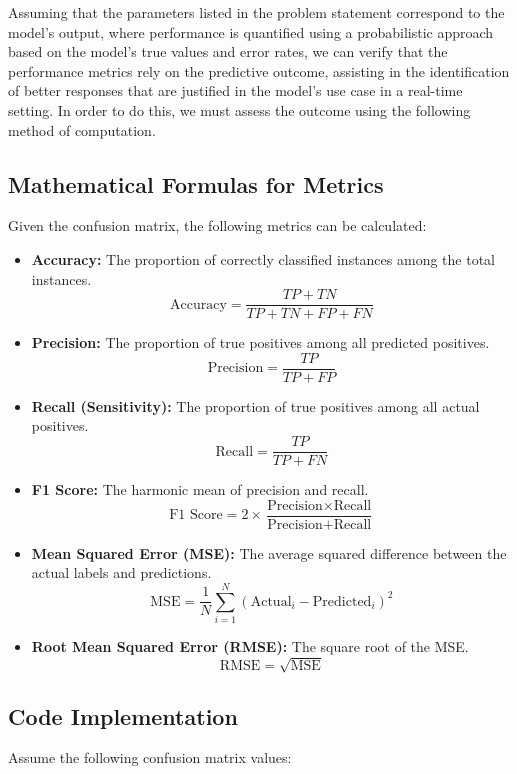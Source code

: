 \documentclass{exam}
\begin{document}
Assuming that the parameters listed in the problem statement correspond to the model's output, where performance is quantified using a probabilistic approach based on the model's true values and error rates, we can verify that the performance metrics rely on the predictive outcome, assisting in the identification of better responses that are justified in the model's use case in a real-time setting. In order to do this, we must assess the outcome using the following method of computation.

\subsection*{Mathematical Formulas for Metrics}
Given the confusion matrix, the following metrics can be calculated:

\begin{itemize}
    \item \textbf{Accuracy:} The proportion of correctly classified instances among the total instances.
    \[
    \text{Accuracy} = \frac{TP + TN}{TP + TN + FP + FN}
    \]
    
    \item \textbf{Precision:} The proportion of true positives among all predicted positives.
    \[
    \text{Precision} = \frac{TP}{TP + FP}
    \]
    
    \item \textbf{Recall (Sensitivity):} The proportion of true positives among all actual positives.
    \[
    \text{Recall} = \frac{TP}{TP + FN}
    \]
    
    \item \textbf{F1 Score:} The harmonic mean of precision and recall.
    \[
    \text{F1\ Score} = 2 \times \frac{\text{Precision} \times \text{Recall}}{\text{Precision} + \text{Recall}}
    \]
    
    \item \textbf{Mean Squared Error (MSE):} The average squared difference between the actual labels and predictions.
    \[
    \text{MSE} = \frac{1}{N} \sum_{i=1}^{N} (\text{Actual}_i - \text{Predicted}_i)^2
    \]
    
    \item \textbf{Root Mean Squared Error (RMSE):} The square root of the MSE.
    \[
    \text{RMSE} = \sqrt{\text{MSE}}
    \]
\end{itemize}

\subsection*{Code Implementation}
Assume the following confusion matrix values:
\end{document}

